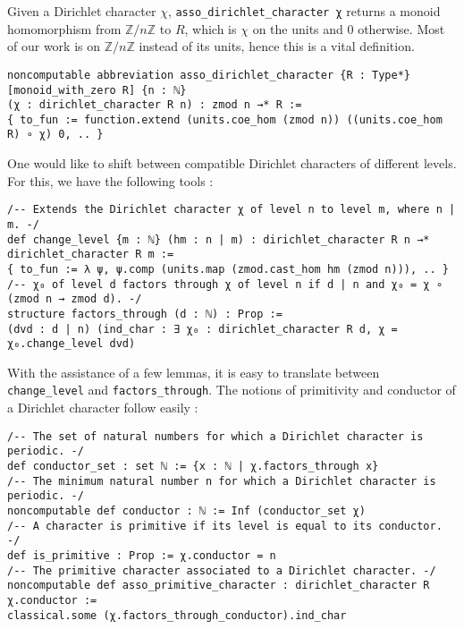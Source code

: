 \documentclass[a4paper,UKenglish,cleveref, autoref, thm-restate]{lipics-v2021}
\newcommand{\lean}[1]{\texttt{#1}\xspace} %
\begin{document}
Given a Dirichlet character $\chi$, \lean{asso\_dirichlet\_character χ} returns a monoid homomorphism from $\mathbb{Z}/n \mathbb{Z}$ 
to $R$, which is $\chi$ on the units and 0 otherwise. Most of our work is on $\mathbb{Z}/n \mathbb{Z}$ instead of its units, hence this 
is a vital definition. 
\begin{lstlisting}
noncomputable abbreviation asso_dirichlet_character {R : Type*} [monoid_with_zero R] {n : ℕ} 
(χ : dirichlet_character R n) : zmod n →* R :=
{ to_fun := function.extend (units.coe_hom (zmod n)) ((units.coe_hom R) ∘ χ) 0, .. }
\end{lstlisting}
One would like to shift between compatible Dirichlet characters of different levels. For this, we have the following tools : 
\begin{lstlisting}
/-- Extends the Dirichlet character χ of level n to level m, where n | m. -/
def change_level {m : ℕ} (hm : n | m) : dirichlet_character R n →* dirichlet_character R m :=
{ to_fun := λ ψ, ψ.comp (units.map (zmod.cast_hom hm (zmod n))), .. }
/-- χ₀ of level d factors through χ of level n if d | n and χ₀ = χ ∘ (zmod n → zmod d). -/
structure factors_through (d : ℕ) : Prop :=
(dvd : d | n) (ind_char : ∃ χ₀ : dirichlet_character R d, χ = χ₀.change_level dvd)
\end{lstlisting}
With the assistance of a few lemmas, it is easy to translate between \lean{change\_level} and \lean{factors\_through}. The notions of primitivity 
and conductor of a Dirichlet character follow easily : \newpage
\begin{lstlisting}
/-- The set of natural numbers for which a Dirichlet character is periodic. -/
def conductor_set : set ℕ := {x : ℕ | χ.factors_through x}
/-- The minimum natural number n for which a Dirichlet character is periodic. -/
noncomputable def conductor : ℕ := Inf (conductor_set χ)
/-- A character is primitive if its level is equal to its conductor. -/
def is_primitive : Prop := χ.conductor = n
/-- The primitive character associated to a Dirichlet character. -/
noncomputable def asso_primitive_character : dirichlet_character R χ.conductor :=
classical.some (χ.factors_through_conductor).ind_char
\end{lstlisting}
\end{document}
